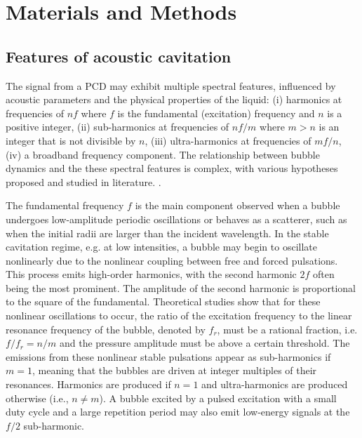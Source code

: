 \documentclass[preprint, linenumbers]{revtex4-2}
\begin{document}
\section{Materials and Methods}
\label{sec:materials_methods}

\subsection{Features of acoustic cavitation}
\label{sec:cavitation_physics}

The signal from a PCD may exhibit multiple spectral features, influenced by acoustic parameters and the physical properties of the liquid: (i) harmonics at frequencies of $nf$ where $f$ is the fundamental (excitation) frequency and $n$ is a positive integer, (ii) sub-harmonics at frequencies of $nf/m$ where $m > n$ is an integer that is not divisible by $n$, (iii) ultra-harmonics at frequencies of $mf/n$, (iv) a broadband frequency component. The relationship between bubble dynamics and the these spectral features is complex, with various hypotheses proposed and studied in literature. \cite{apfel1981, prosperetti1984, neppiras1980, lauterborn1976, lauterborn2010, lauterborn2015}.

The fundamental frequency $f$ is the main component observed when a bubble undergoes low-amplitude periodic oscillations or behaves as a scatterer, such as when the initial radii are larger than the incident wavelength. \cite{neppiras1980} In the stable cavitation regime, e.g. at low intensities, a bubble may begin to oscillate nonlinearly due to the nonlinear coupling between free and forced pulsations. This process emits high-order harmonics, with the second harmonic $2f$ often being the most prominent. The amplitude of the second harmonic is proportional to the square of the fundamental. \cite{neppiras1980} Theoretical studies show that for these nonlinear oscillations to occur, the ratio of the excitation frequency to the linear resonance frequency of the bubble, denoted by $f_r$, must be a rational fraction, i.e. $f/f_r = n/m$ and the pressure amplitude must be above a certain threshold. \cite{neppiras1980} The emissions from these nonlinear stable pulsations appear as sub-harmonics if $m=1$, meaning that the bubbles are driven at integer multiples of their resonances. Harmonics are produced if $n=1$ and ultra-harmonics are produced otherwise (i.e., $n \neq m$). \cite{lauterborn1976, apfel1981, lauterborn2015} A bubble excited by a pulsed excitation with a small duty cycle and a large repetition period may also emit low-energy signals at the $f/2$ sub-harmonic. \cite{neppiras1980}
\end{document}
